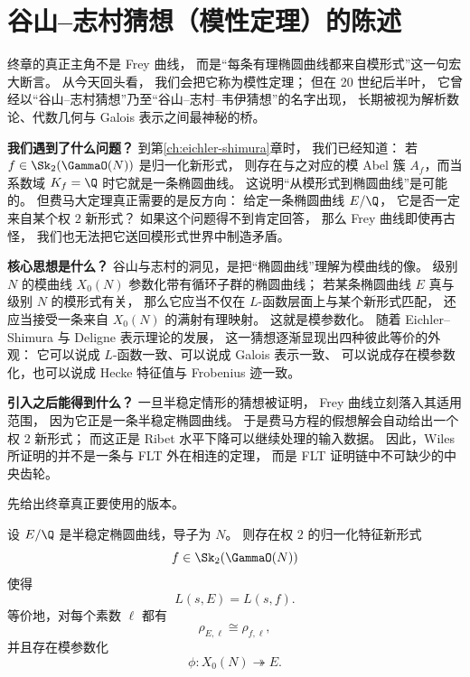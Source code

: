 \section{谷山--志村猜想（模性定理）的陈述}
\label{sec:ch10-ts}

\providecommand{\Zl}{\mathbb{Z}_\ell}
\providecommand{\Ql}{\mathbb{Q}_\ell}

终章的真正主角不是 Frey 曲线，
而是“每条有理椭圆曲线都来自模形式”这一句宏大断言。
从今天回头看，
我们会把它称为模性定理；
但在 20 世纪后半叶，
它曾经以“谷山--志村猜想”乃至“谷山--志村--韦伊猜想”的名字出现，
长期被视为解析数论、代数几何与 Galois 表示之间最神秘的桥。

\textbf{我们遇到了什么问题？}
到第\ref{ch:eichler-shimura}章时，
我们已经知道：
若 $f\in \Sk_2(\GammaO(N))$ 是归一化新形式，
则存在与之对应的模 Abel 簇 $A_f$，而当系数域 $K_f=\Q$ 时它就是一条椭圆曲线。
这说明“从模形式到椭圆曲线”是可能的。
但费马大定理真正需要的是反方向：
给定一条椭圆曲线 $E/\Q$，
它是否一定来自某个权 $2$ 新形式？
如果这个问题得不到肯定回答，
那么 Frey 曲线即使再古怪，
我们也无法把它送回模形式世界中制造矛盾。

\textbf{核心思想是什么？}
谷山与志村的洞见，是把“椭圆曲线”理解为模曲线的像。
级别 $N$ 的模曲线 $X_0(N)$ 参数化带有循环子群的椭圆曲线；
若某条椭圆曲线 $E$ 真与级别 $N$ 的模形式有关，
那么它应当不仅在 $L$-函数层面上与某个新形式匹配，
还应当接受一条来自 $X_0(N)$ 的满射有理映射。
这就是模参数化。
随着 Eichler--Shimura 与 Deligne 表示理论的发展，
这一猜想逐渐显现出四种彼此等价的外观：
它可以说成 $L$-函数一致、可以说成 Galois 表示一致、
可以说成存在模参数化，也可以说成 Hecke 特征值与 Frobenius 迹一致。

\textbf{引入之后能得到什么？}
一旦半稳定情形的猜想被证明，
Frey 曲线立刻落入其适用范围，
因为它正是一条半稳定椭圆曲线。
于是费马方程的假想解会自动给出一个权 $2$ 新形式；
而这正是 Ribet 水平下降可以继续处理的输入数据。
因此，Wiles 所证明的并不是一条与 FLT 外在相连的定理，
而是 FLT 证明链中不可缺少的中央齿轮。



先给出终章真正要使用的版本。

\begin{theorem}
\label{thm:wiles}
设 $E/\Q$ 是半稳定椭圆曲线，导子为 $N$。
则存在权 $2$ 的归一化特征新形式
\[
  f\in \Sk_2(\GammaO(N))
\]
使得
\[
  L(s,E)=L(s,f).
\]
等价地，对每个素数 $\ell$ 都有
\[
  \rho_{E,\ell}\cong \rho_{f,\ell},
\]
并且存在模参数化
\[
  \phi\colon X_0(N)\twoheadrightarrow E.
\]
\end{theorem}

